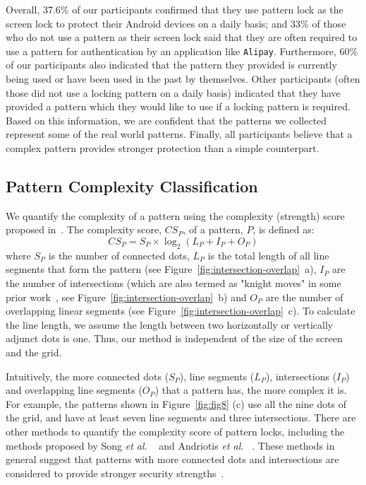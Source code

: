      Overall, 37.6\% of our participants confirmed that they use pattern lock as the screen lock to
     protect their Android devices on a daily basis; and 33\% of those  who do not use a pattern as their screen lock said that they
     are often required to use a pattern for authentication by an application like \texttt{Alipay}. Furthermore, 60\%
     of our participants also indicated that the pattern they provided is currently being used
     or have been used in the past by themselves. Other participants (often those did not use a locking pattern on a daily basis) indicated that they
     have provided a pattern which they would like to use if a locking
     pattern is required. Based on this information, we are confident
     that the patterns we collected represent some of the real world
     patterns. Finally, all participants believe that a complex pattern provides stronger protection than a simple counterpart.

    \subsection{Pattern Complexity Classification}
    \label{section: pattern-complexity-classification}
    We quantify the complexity of a pattern using the complexity (strength) score proposed in~\cite{sun2014dissecting}.
        The complexity score, $CS_{P}$, of a pattern, $P$, is defined as:
    \begin{equation}
      CS_{P}=S_{P}\times\log_{2}(L_{P}+I_{P}+O_{P})
    \label{equ:compscore}
    \end{equation}
    where $S_{P}$ is the number of connected dots, $L_{P}$ is the
    total length of all line segments that form the pattern (see
    Figure~\ref{fig:intersection-overlap}~a), $I_{P}$ are the number of
    intersections (which are also termed as "knight moves" in some prior
    work~\cite{Von2015Easy}, see
    Figure~\ref{fig:intersection-overlap}~b) and $O_{P}$ are the number of
    overlapping linear segments (see
    Figure~\ref{fig:intersection-overlap}~c).  To calculate the line length,
    we assume the length between two horizontally or vertically adjunct dots
    is one. Thus, our method is independent of the size of the screen and the
    grid.


    Intuitively, the more connected dots ($S_{P}$), line segments ($L_{P}$),
    intersections ($I_{P}$) and overlapping line segments ($O_{P}$) that a
    pattern has, the more complex it is. For example, the patterns shown in
    Figure~\ref{fig:fig8} (c) use all the nine dots of the grid, and have  at
    least seven line segments and three intersections.
    There are other methods to quantify the complexity score of pattern locks, including the methods proposed by Song \emph{et al.} ~\cite{Song2015On} and Andriotis \emph{et al.}
    ~\cite{Andriotis2014Complexity}. These methods in general suggest that patterns with more connected dots and intersections are considered to provide stronger security strengths~\cite{Heidt2016Refining}.

